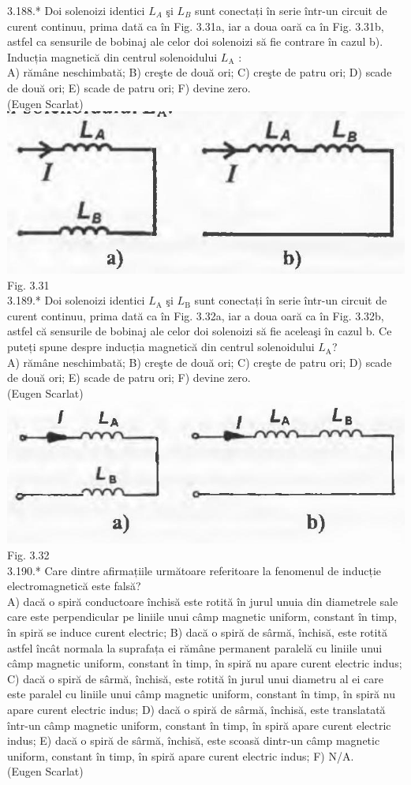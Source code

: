 3.188.* Doi solenoizi identici $L_{A}$ şi $L_{B}$ sunt conectați în serie într-un circuit de curent continuu, prima dată ca în Fig. 3.31a, iar a doua oară ca în Fig. 3.31b, astfel ca sensurile de bobinaj ale celor doi solenoizi să fie contrare în cazul b). Inducția magnetică din centrul solenoidului $L_{\mathrm{A}}$ :\\ A) rămâne neschimbată; B) creşte de două ori; C) creşte de patru ori; D) scade de două ori; E) scade de patru ori; F) devine zero.\\ (Eugen Scarlat)\\ \includegraphics[width=0.4\linewidth]{images/2025_07_01_5b3ff9fa0d508c8e9f17g-187} Fig. 3.31\\

3.189.* Doi solenoizi identici $L_{\mathrm{A}}$ şi $L_{\mathrm{B}}$ sunt conectați în serie într-un circuit de curent continuu, prima dată ca în Fig. 3.32a, iar a doua oară ca în Fig. 3.32b, astfel că sensurile de bobinaj ale celor doi solenoizi să fie aceleaşi în cazul b. Ce puteți spune despre inducția magnetică din centrul solenoidului $L_{\mathrm{A}}$?\\ A) rămâne neschimbată; B) creşte de două ori; C) creşte de patru ori; D) scade de două ori; E) scade de patru ori; F) devine zero.\\ (Eugen Scarlat)\\ \includegraphics[width=0.4\linewidth]{images/2025_07_01_5b3ff9fa0d508c8e9f17g-187(1)} Fig. 3.32\\

3.190.* Care dintre afirmațiile următoare referitoare la fenomenul de inducție electromagnetică este falsă?\\ A) dacă o spiră conductoare închisă este rotită în jurul unuia din diametrele sale care este perpendicular pe liniile unui câmp magnetic uniform, constant în timp, în spiră se induce curent electric; B) dacă o spiră de sârmă, închisă, este rotită astfel încât normala la suprafața ei rămâne permanent paralelă cu liniile unui câmp magnetic uniform, constant în timp, în spiră nu apare curent electric indus; C) dacă o spiră de sârmă, închisă, este rotită în jurul unui diametru al ei care este paralel cu liniile unui câmp magnetic uniform, constant în timp, în spiră nu apare curent electric indus; D) dacă o spiră de sârmă, închisă, este translatată într-un câmp magnetic uniform, constant în timp, în spiră apare curent electric indus; E) dacă o spiră de sârmă, închisă, este scoasă dintr-un câmp magnetic uniform, constant în timp, în spiră apare curent electric indus; F) N/A.\\ (Eugen Scarlat)\\

